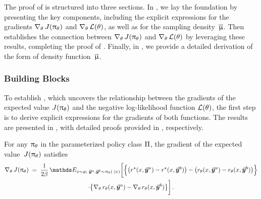	The proof of  is structured into three sections. In , we lay the foundation by presenting the key components, including the explicit expressions for the gradients $\nabla_{\theta} \,  J(\uppi_{\theta})$ and $\nabla_{\theta} \,  \mathcal{L}(\theta)$, as well as for the sampling density~$\overline{\upmu}$.
	Then  establishes the connection between $\nabla_{\theta} \,  J(\uppi_{\theta})$ and $\nabla_{\theta} \,  \mathcal{L}(\theta)$ by leveraging these results, completing the proof of . 
	Finally, in , we provide a detailed derivation of the form of density function~$\overline{\upmu}$.
	
	\subsubsection{Building Blocks \yaqidone}
	\label{sec:proof:thm:grad_1}
	
	To establish , which uncovers the relationship between the gradients of the expected value $J(\uppi_{\theta})$ and the negative log-likelihood function $\mathcal{L}(\theta)$, the first step is to derive explicit expressions for the gradients of both functions. The results are presented in , with detailed proofs provided in , respectively.
	\begin{lemma}
		\label{lemma:grad_scalarvalue}
		For any $\uppi_{\theta}$ in the parameterized policy class $\Pi$, the gradient of the expected value~$J(\uppi_{\theta})$ satisfies
			\begin{multline}
				\label{eq:grad_scalarvalue}
				\gradtheta \scalarvalue(\policytheta)
				\; = \; \frac{1}{2 \parabeta} \, \Exp_{\prompt \sim \promptdistr; \; \responseone, \responsetwo \sim \policytheta(\cdot \mid \prompt)} 
				\bigg[ \Big\{ \big( \rewardstar(\context, \responseone) - \rewardstar(\context, \responsetwo) \big) - \big( \rewardtheta(\context, \responseone) - \rewardtheta(\context, \responsetwo) \big) \Big\} \\ 
				\cdot \big\{ \gradtheta \rewardtheta(\prompt, \responseone) - \gradtheta \rewardtheta(\prompt, \responsetwo) \big\} \bigg] \, .
			\end{multline}
	\end{lemma}
	
